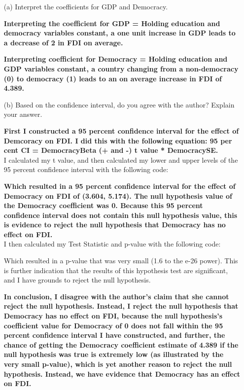 \documentclass[12pt,letterpaper]{article}
\begin{document}
\begin{enumerate}
	\item [(a)] Interpret the coefficients for GDP and Democracy.
	
	\textbf{Interpreting the coefficient for GDP = Holding education and democracy variables constant, a one unit increase in GDP leads to a decrease of 2 in FDI on average.}
	
	\textbf{Interpreting coefficient for Democracy = Holding education and GDP variables constant, a country changing from a non-democracy (0) to democracy (1) leads to an on average increase in FDI of 4.389. }		
		
	\item [(b)] Based on the confidence interval, do you agree with the author? Explain your answer.
	
	\textbf{First I constructed a 95 percent confidence interval for the effect of Demcoracy on FDI. I did this with the following equation: 95 per cent CI = DemocracyBeta (+ and -) t value * DemocracySE.  }
	\\
	I calculated my t value, and then calculated my lower and upper levels of the 95 percent confidence interval with the following code:
	
	
	\textbf{Which resulted in a 95 percent confidence interval for the effect of Democracy on FDI of (3.604, 5.174). The null hypothesis value of the Democracy coefficient was 0. Because this 95 percent confidence interval does not contain this null hypothesis value, this is evidence to reject the null hypothesis that Democracy has no effect on FDI.}
	\\
	I then calculated my Test Statistic and p-value with the following code:
	
	Which resulted in a p-value that was very small (1.6 to the e-26 power). This is further indication that the results of this hypothesis test are significant, and I have grounds to reject the null hypothesis.
	
	\textbf{In conclusion, I disagree with the author's claim that she cannot reject the null hypothesis. Instead, I reject the null hypothesis that Democracy has no effect on FDI, because the null hypothesis's coefficient value for Democracy of 0 does not fall within the 95 percent confidence interval I have constructed, and further, the chance of getting the Democracy coefficient estimate of 4.389 if the null hypothesis was true is extremely low (as illustrated by the very small p-value), which is yet another reason to reject the null hypothesis. Instead, we have evidence that Democracy has an effect on FDI. }


\end{enumerate}
\end{document}
